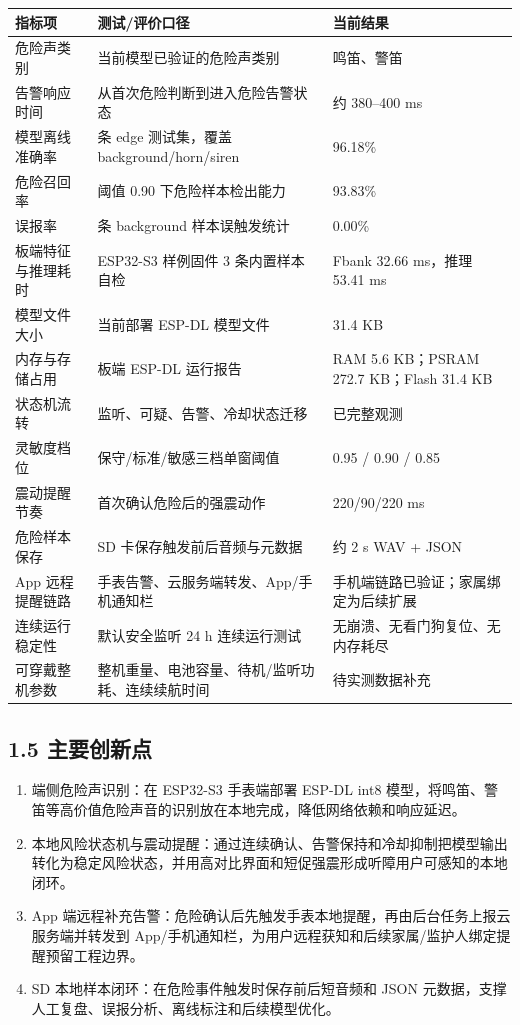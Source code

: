 \documentclass[UTF8,a4paper,12pt]{ctexart}
\begin{document}
{\small
\noindent\begin{tabularx}{\linewidth}{p{3.2cm}>{\RaggedRight\arraybackslash}X p{3.0cm}}
\toprule
指标项 & 测试/评价口径 & 当前结果 \\
\midrule
危险声类别 & 当前模型已验证的危险声类别 & 鸣笛、警笛 \\
告警响应时间 & 从首次危险判断到进入危险告警状态 & 约 380--400 ms \\
模型离线准确率 & 131 条 edge 测试集，覆盖 background/horn/siren & 96.18\% \\
危险召回率 & 阈值 0.90 下危险样本检出能力 & 93.83\% \\
误报率 & 50 条 background 样本误触发统计 & 0.00\% \\
板端特征与推理耗时 & ESP32-S3 样例固件 3 条内置样本自检 & Fbank 32.66 ms，推理 53.41 ms \\
模型文件大小 & 当前部署 ESP-DL 模型文件 & 31.4 KB \\
内存与存储占用 & 板端 ESP-DL 运行报告 & RAM 5.6 KB；PSRAM 272.7 KB；Flash 31.4 KB \\
状态机流转 & 监听、可疑、告警、冷却状态迁移 & 已完整观测 \\
灵敏度档位 & 保守/标准/敏感三档单窗阈值 & 0.95 / 0.90 / 0.85 \\
震动提醒节奏 & 首次确认危险后的强震动作 & 220/90/220 ms \\
危险样本保存 & SD 卡保存触发前后音频与元数据 & 约 2 s WAV + JSON \\
App 远程提醒链路 & 手表告警、云服务端转发、App/手机通知栏 & 手机端链路已验证；家属绑定为后续扩展 \\
连续运行稳定性 & 默认安全监听 24 h 连续运行测试 & 无崩溃、无看门狗复位、无内存耗尽 \\
可穿戴整机参数 & 整机重量、电池容量、待机/监听功耗、连续续航时间 & 待实测数据补充 \\
\bottomrule
\end{tabularx}
}

\subsection*{1.5 主要创新点}

\begin{enumerate}
  \item 端侧危险声识别：在 ESP32-S3 手表端部署 ESP-DL int8 模型，将鸣笛、警笛等高价值危险声音的识别放在本地完成，降低网络依赖和响应延迟。
  \item 本地风险状态机与震动提醒：通过连续确认、告警保持和冷却抑制把模型输出转化为稳定风险状态，并用高对比界面和短促强震形成听障用户可感知的本地闭环。
  \item App 端远程补充告警：危险确认后先触发手表本地提醒，再由后台任务上报云服务端并转发到 App/手机通知栏，为用户远程获知和后续家属/监护人绑定提醒预留工程边界。
  \item SD 本地样本闭环：在危险事件触发时保存前后短音频和 JSON 元数据，支撑人工复盘、误报分析、离线标注和后续模型优化。
\end{enumerate}
\end{document}
